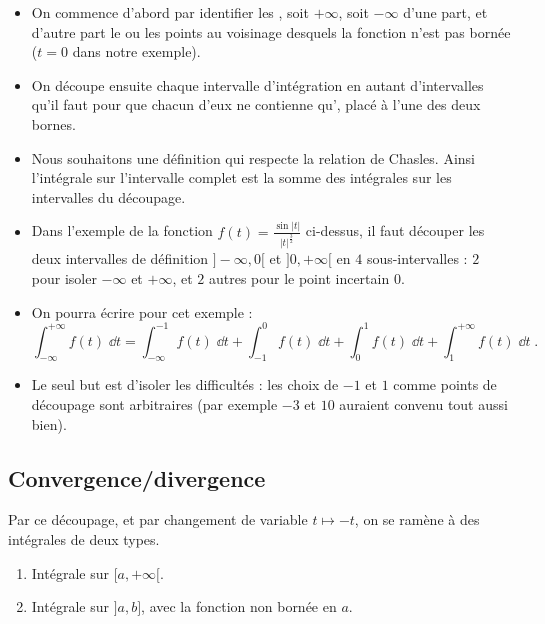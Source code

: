 \documentclass[class=report,crop=false]{standalone}
\begin{document}
\begin{itemize}
  \item On commence d'abord par identifier les , soit
$+\infty$, soit $-\infty$ d'une part, et d'autre part le ou les points au voisinage
desquels la fonction n'est pas bornée ($t=0$ dans notre exemple).
  
  \item On découpe ensuite chaque intervalle d'intégration en autant d'intervalles
qu'il faut pour que chacun d'eux ne contienne qu', placé à l'une des deux bornes. 

  \item Nous souhaitons une définition qui respecte la relation de Chasles.
  Ainsi l'intégrale sur l'intervalle complet est la somme des
intégrales sur les intervalles du découpage.

  \item Dans l'exemple de la
fonction $f(t)=\frac{\sin |t|}{|t|^{\frac32}}$ ci-dessus, 
il faut découper les deux intervalles de définition $]-\infty,0[$ et $]0,+\infty[$
en $4$ sous-intervalles : $2$ pour isoler
$-\infty$ et $+\infty$, et $2$ autres pour le point incertain $0$.

  \item On pourra écrire pour cet exemple :
$$
\int_{-\infty}^{+\infty} f(t)\;\dd t
=
\int_{-\infty}^{-1} f(t)\;\dd t+
\int_{-1}^{0} f(t)\;\dd t+
\int_{0}^{1} f(t)\;\dd t+
\int_{1}^{+\infty} f(t)\;\dd t\;.
$$
  \item Le seul but est d'isoler les difficultés : les choix de $-1$ et $1$
comme points de découpage sont arbitraires (par exemple $-3$ et $10$ auraient
convenu tout aussi bien). 
\end{itemize}


\subsection{Convergence/divergence}


Par ce découpage, et par changement de variable $t\mapsto-t$,
on se ramène à des intégrales de deux types.
\begin{enumerate}
\item Intégrale sur $[a,+\infty[$.
\item Intégrale sur $]a,b]$, avec la fonction non bornée en $a$.
\end{enumerate}
\end{document}
